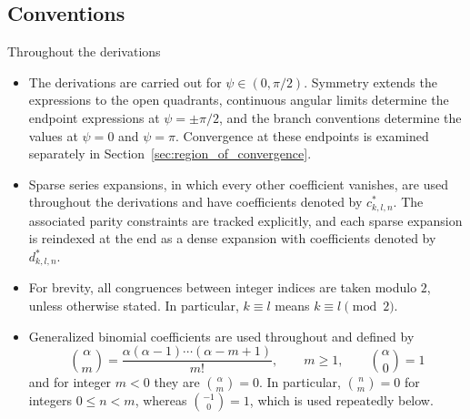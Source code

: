 \documentclass[a4paper]{amsart}
\begin{document}
\subsection{Conventions}
Throughout the derivations
\begin{itemize}
\item The derivations are carried out for $\psi\in(0,\pi/2)$. Symmetry extends the expressions to the open quadrants, continuous angular limits determine the endpoint expressions at $\psi=\pm\pi/2$, and the branch conventions determine the values at $\psi=0$ and $\psi=\pi$. Convergence at these endpoints
is examined separately in Section~\ref{sec:region_of_convergence}.
\item Sparse series expansions, in which every other coefficient vanishes, are used throughout the derivations and have coefficients denoted by $c^{*}_{k,l,n}$. The associated parity constraints are tracked explicitly, and each sparse expansion is reindexed at the end as a dense expansion with coefficients denoted by $d^{*}_{k,l,n}$.
\item For brevity, all congruences between integer indices are taken modulo $2$, unless otherwise stated. In particular, $k\equiv l$ means $k\equiv l \pmod 2$.
\item Generalized binomial coefficients are used throughout and defined by
\begin{equation*}
\binom{\alpha}{m}
=\frac{\alpha(\alpha-1)\cdots(\alpha-m+1)}{m!},
\qquad m\geq1,
\qquad
\binom{\alpha}{0}=1
\end{equation*}
and for integer $m<0$ they are $\binom{\alpha}{m}=0$. In particular, $\binom{n}{m}=0$ for integers $0\leq n<m$, whereas $\binom{-1}{0}=1$, which is used repeatedly below.
\end{itemize}
\end{document}
